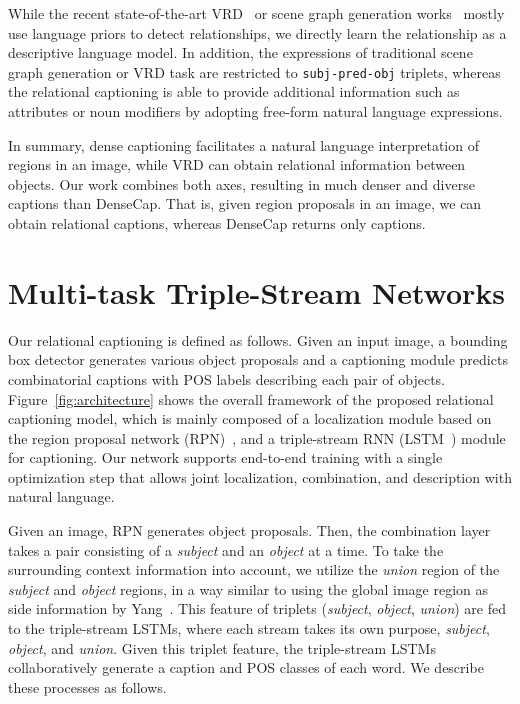 \documentclass[10pt,twocolumn,letterpaper]{article}
\begin{document}
While the recent state-of-the-art VRD~\cite{li2017vip,lu2016visual,plummer2016phrase,yu2017visual,yin2018zoom} {or scene graph generation works~\cite{li2017scene,woo2018linknet,xu2017scene,zellers2018neural}} mostly use language priors to detect relationships, we directly learn the relationship as a descriptive language model.
{In addition, the expressions of traditional scene graph generation or VRD task are restricted to \texttt{subj-pred-obj} triplets, whereas the relational captioning is able to provide additional information such as attributes or noun modifiers by adopting free-form natural language expressions. }







In summary, dense captioning facilitates a natural language interpretation of regions in an image, while VRD can obtain relational information between objects. 
Our work combines both axes, resulting in much denser and diverse captions than DenseCap.
That is, given  region proposals in an image, we can obtain  relational captions, whereas DenseCap returns only  captions. 


 

\section{Multi-task Triple-Stream Networks}


Our relational captioning is defined as follows. 
Given an input image, a bounding box detector generates various object proposals and a captioning module predicts combinatorial captions with POS labels describing each pair of objects.
Figure~\ref{fig:architecture} shows the overall framework of the proposed relational captioning model, which is mainly composed of a localization module based on the region proposal network (RPN)~\cite{ren2015faster}, and a triple-stream RNN (LSTM~\cite{hochreiter1997long}) module for captioning.
Our network supports end-to-end training with a single optimization step that allows joint localization, combination, and description with natural language.


Given an image, RPN generates object proposals.
Then, the combination layer takes a pair consisting of a \emph{subject} and an \emph{object} at a time.
To take the surrounding context information into account, we utilize the \emph{union} region of the \emph{subject} and \emph{object} regions, in a way similar to using the global image region as side information by Yang~\etal\cite{Yang_2017_CVPR}.
This feature of triplets (\emph{subject}, \emph{object}, \emph{union}) are fed to the triple-stream LSTMs, where each stream takes its own purpose, \ie\emph{subject}, \emph{object}, and \emph{union}.
Given this triplet feature, the triple-stream LSTMs collaboratively generate a caption and POS classes of each word.
We describe these processes as follows.
\end{document}
